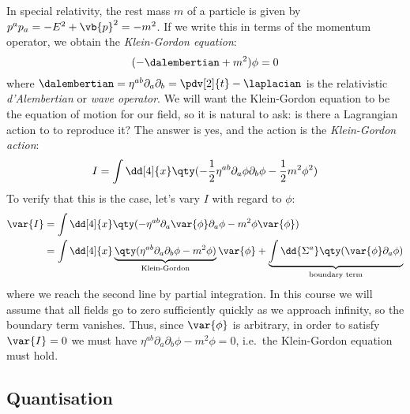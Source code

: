 \documentclass{jknotes} %
\begin{document}
In special relativity, the rest mass \(m\) of a particle is given by \(p^ap_a = -E^2+\vb{p}^2 = -m^2\). If we write this in terms of the momentum operator, we obtain the \emph{Klein-Gordon equation}:
\begin{equation}
    (-\dalembertian + m^2)\phi = 0
\end{equation}
where \(\dalembertian = \eta^{ab}\partial_a\partial_b = \pdv[2]{t} - \laplacian\) is the relativistic \emph{d'Alembertian} or \emph{wave operator}.
We will want the Klein-Gordon equation to be the equation of motion for our field, so it is natural to ask: is there a Lagrangian action to to reproduce it? The answer is yes, and the action is the \emph{Klein-Gordon action}:
\begin{equation}
    I = \int \dd[4]{x} \qty(-\frac{1}{2}\eta^{ab}\partial_a\phi\partial_b \phi- \frac{1}{2}m^2\phi^2)
\end{equation}
To verify that this is the case, let's vary \(I\) with regard to \(\phi\):
\begin{align}
    \var{I} &= \int \dd[4]{x} \qty(-\eta^{ab} \partial_a \var{\phi} \partial_a \phi - m^2 \phi \var{\phi}) \\
    &= \int \dd[4]{x} \underbrace{\qty(\eta^{ab} \partial_a\partial_b\phi - m^2\phi)}_\text{Klein-Gordon} \var{\phi}
    + \underbrace{\int \dd{\Sigma^a} \qty(\var{\phi}\partial_a\phi)}_\text{boundary term}
\end{align}
where we reach the second line by partial integration. In this course we will assume that all fields go to zero sufficiently quickly as we approach infinity, so the boundary term vanishes. Thus, since \(\var{\phi}\) is arbitrary, in order to satisfy \(\var{I}=0\) we must have \(\eta^{ab} \partial_a\partial_b\phi - m^2\phi = 0\), i.e.\ the Klein-Gordon equation must hold.

\subsection{Quantisation}
\end{document}

